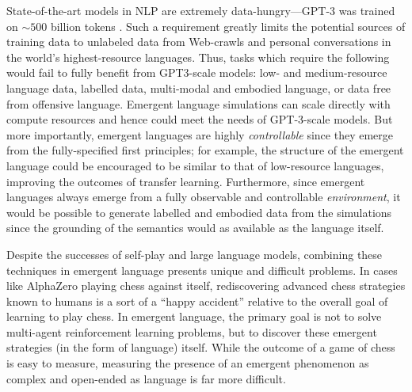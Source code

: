 State-of-the-art models in NLP are extremely data-hungry---GPT-3 was trained on ${\sim}500$ billion tokens \citep{brown2020language}.
Such a requirement greatly limits the potential sources of training data to unlabeled data from Web-crawls and personal conversations in the world's highest-resource languages.
Thus, tasks which require the following would fail to fully benefit from GPT3-scale models:
    low- and medium-resource language data,
    labelled data,
    multi-modal and embodied language,
    or data free from offensive language.
Emergent language simulations can scale directly with compute resources and hence could meet the needs of GPT-3-scale models.
But more importantly, emergent languages are highly \emph{controllable} since they emerge from the fully-specified first principles; for example, the structure of the emergent language could be encouraged to be similar to that of low-resource languages, improving the outcomes of transfer learning.
Furthermore, since emergent languages always emerge from a fully observable and controllable \emph{environment}, it would be possible to generate labelled and embodied data from the simulations since the grounding of the semantics would as available as the language itself.


Despite the successes of self-play and large language models, combining these techniques in emergent language presents unique and difficult problems.
In cases like AlphaZero playing chess against itself, rediscovering advanced chess strategies known to humans is a sort of a ``happy accident'' relative to the overall goal of learning to play chess.
In emergent language, the primary goal is not to solve multi-agent reinforcement learning problems, but to discover these emergent strategies (in the form of language) itself.
While the outcome of a game of chess is easy to measure, measuring the presence of an emergent phenomenon as complex and open-ended as language is far more difficult.

